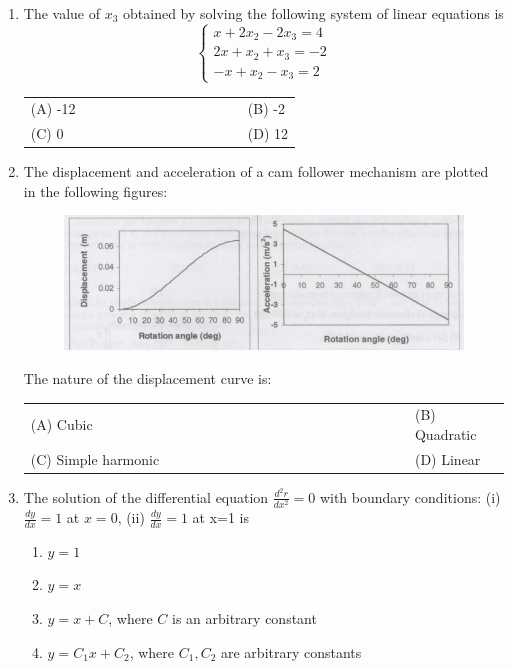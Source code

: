 \documentclass[a4paper,12pt]{article}
\begin{document}
\begin{enumerate}[label=Q.\arabic*, leftmargin=*]
\item The value of $x_3$ obtained by solving the following system of linear equations is
$$
\begin{cases}
x + 2x_2 - 2x_3 = 4 \\
2x + x_2 + x_3 = -2 \\
-x + x_2 - x_3 = 2
\end{cases}
$$
\begin{multicols}{2}
\begin{tabular}[t]{p{0.8\linewidth} p{0.9\linewidth}}
(A) -12 & (B) -2 \\
(C) 0 & (D) 12 \\
\end{tabular}
\end{multicols}

\item The displacement and acceleration of a cam follower mechanism are plotted in the following figures:
\begin{figure}[h]
    \centering
    \includegraphics[width=1\linewidth]{figs/1.png}
    \label{fig:placeholder}
\end{figure} 
The nature of the displacement curve is:
\begin{multicols}{2}
\begin{tabular}[t]{p{0.8\linewidth} p{0.9\linewidth}}
(A) Cubic & (B) Quadratic \\
(C) Simple harmonic & (D) Linear \\
\end{tabular}
\end{multicols}

\item The solution of the differential equation
$
\frac{d^2 r}{dx^2} = 0
$
with boundary conditions: (i) $\frac{dy}{dx} = 1$ at $x = 0$, (ii) $\frac{dy}{dx} = 1$ at x=1 is
\begin{enumerate}[label=(\Alph*)]
\item $y = 1$ 
\item $y = x$ 
\item $y = x + C$, where $C$ is an arbitrary constant  
\item $y = C_1 x + C_2$, where $C_1, C_2$ are arbitrary constants \\


\end{enumerate}
\end{enumerate}
\end{document}
